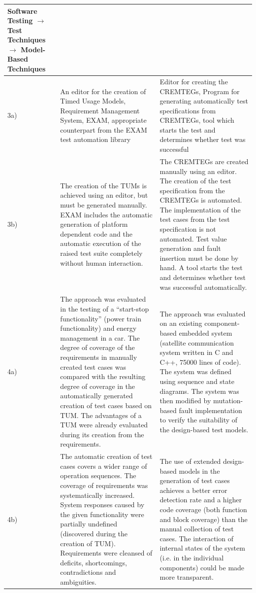 \begin{small}
\begin{longtable}[h]{p{0.45cm}|p{}|p{}}
Software Testing $\rightarrow$ Test Techniques $\rightarrow$
Model-Based Techniques \\
\hline 
3a)  & An editor for the creation of Timed Usage Models, Requirement Management
System, EXAM, appropriate counterpart from the EXAM test automation
library  & Editor for creating the CREMTEGs, Program for generating automatically
test specifications from CREMTEGs, tool which starts the test and
determines whether test was successful\\
\hline 
3b)  & The creation of the TUMs is achieved using an editor, but must be
generated manually. EXAM includes the automatic generation of platform
dependent code and the automatic execution of the raised test suite
completely without human interaction.  & The CREMTEGs are created manually using an editor. The creation of
the test specification from the CREMTEGs is automated. The implementation
of the test cases from the test specification is not automated. Test
value generation and fault insertion must be done by hand. A tool
starts the test and determines whether test was successful automatically.\\
\hline 
4a) & The approach was evaluated in the testing of a \enquote{start-stop
functionality} (power train functionality) and energy
management in a car. The degree of coverage of the requirements in
manually created test cases was compared with the resulting degree
of coverage in the automatically generated creation of test cases
based on TUM. The advantages of a TUM were already evaluated during
its creation from the requirements.  & The approach was evaluated on an existing component-based embedded
system (satellite communication system written in C and C++, 75000
lines of code). The system was defined using sequence and state diagrams.
The system was then modified by mutation-based fault implementation
to verify the suitability of the design-based test models.\\
\hline 
4b) & The automatic creation of test cases covers a wider range of operation
sequences. The coverage of requirements was systematically increased.
System responses caused by the given functionality were partially
undefined (discovered during the creation of TUM). Requirements were
cleansed of deficits, shortcomings, contradictions and ambiguities.  & The use of extended design-based models in the generation of test
cases achieves a better error detection rate and a higher code coverage
(both function and block coverage) than the manual collection of test
cases. The interaction of internal states of the system (i.e. in the
individual components) could be made more transparent.\\
\hline 
\end{longtable}
\end{small}

